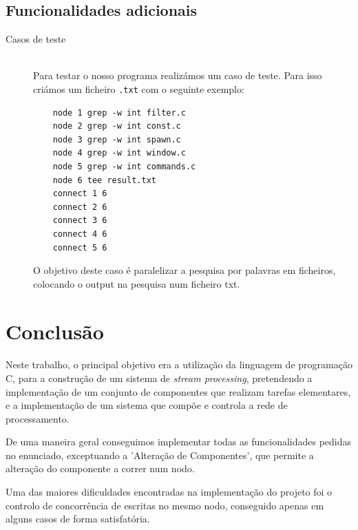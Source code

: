 \documentclass[12pt]{article}
\begin{document}
\newpage
\subsection{Funcionalidades adicionais}

\begin{description} 
\item[Casos de teste] \hfill \\
Para testar o nosso programa realizámos um caso de teste. Para isso criámos um ficheiro \texttt{.txt} com o seguinte exemplo:
\begin{verbatim}
    node 1 grep -w int filter.c
    node 2 grep -w int const.c
    node 3 grep -w int spawn.c
    node 4 grep -w int window.c
    node 5 grep -w int commands.c
    node 6 tee result.txt
    connect 1 6
    connect 2 6
    connect 3 6
    connect 4 6
    connect 5 6
\end{verbatim}
O objetivo deste caso é paralelizar a pesquisa por palavras em ficheiros, colocando o output na pesquisa num ficheiro txt. 


\end{description}

\newpage

\section{Conclusão} 
\paragraph{}
Neste trabalho, o principal objetivo era a utilização da linguagem de programação C, para a construção de um sistema de \textit{stream processing}, pretendendo a implementação de um conjunto de componentes que realizam tarefas elementares, e a implementação de um sistema que compõe e controla a rede de processamento.

De uma maneira geral conseguimos implementar todas as funcionalidades pedidas no enunciado, exceptuando a 'Alteração de Componentes', que permite a alteração do componente a correr num nodo. 

Uma das maiores dificuldades encontradas na implementação do projeto foi o controlo de concorrência de escritas no mesmo nodo, conseguido apenas em alguns casos de forma satisfatória. 


\end{document}
